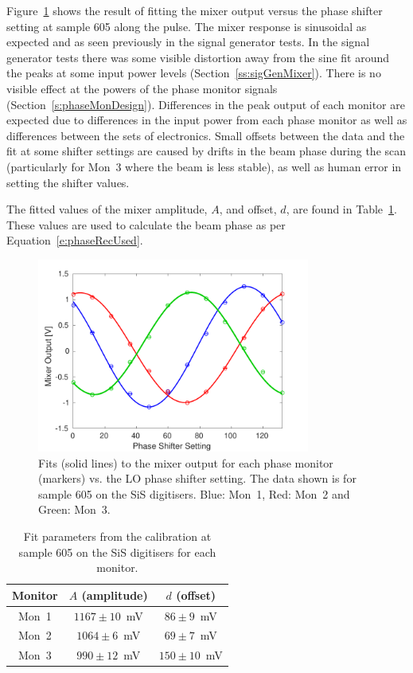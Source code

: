 Figure~\ref{f:calSiS} shows the result of fitting the mixer output versus the phase shifter setting at sample 605 along the pulse. The mixer response is sinusoidal as expected and as seen previously in the signal generator tests. In the signal generator tests there was some visible distortion away from the sine fit around the peaks at some input power levels (Section~\ref{ss:sigGenMixer}). There is no visible effect at the powers of the phase monitor signals (Section~\ref{s:phaseMonDesign}). Differences in the peak output of each monitor are expected due to differences in the input power from each phase monitor as well as differences between the sets of electronics. Small offsets between the data and the fit at some shifter settings are caused by drifts in the beam phase during the scan (particularly for Mon~3 where the beam is less stable), as well as human error in setting the shifter values.

The fitted values of the mixer amplitude, \(A\), and offset, \(d\), are found in Table~\ref{t:calSiSConsts}. These values are used to calculate the beam phase as per Equation~\ref{e:phaseRecUsed}. 

\begin{figure}
  \centering
  \includegraphics[width=0.8\textwidth]{Figures/phaseMons/calSiS}
  \caption{Fits (solid lines) to the mixer output for each phase monitor (markers) vs. the LO phase shifter setting. The data shown is for sample 605 on the SiS digitisers. Blue: Mon~1, Red: Mon~2 and Green: Mon~3.}
  \label{f:calSiS}
\end{figure}

\begin{table}
  \begin{center}
    \begin{tabular}{|c c c|}
	   \hline
       Monitor & \(A\) (amplitude) & \(d\) (offset) \\ \hline
       Mon~1 & \(1167\pm10\)~mV & \(86\pm9\)~mV \\ 
       Mon~2 & \(1064\pm6\)~mV & \(69\pm7\)~mV\\
       Mon~3 & \(990\pm12\)~mV & \(150\pm10\)~mV\\ \hline
    \end{tabular}
    \caption{Fit parameters from the calibration at sample 605 on the SiS digitisers for each monitor.}
  	\label{t:calSiSConsts}
  \end{center}
\end{table}

